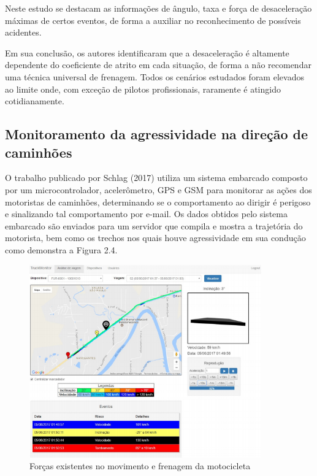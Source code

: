 \clearpage




Neste estudo se destacam as informações de ângulo, taxa e força de desaceleração máximas de certos eventos, de forma a auxiliar no reconhecimento de possíveis acidentes. 

Em sua conclusão, os autores identificaram que a desaceleração é altamente dependente do coeficiente de atrito em cada situação, de forma a não recomendar uma técnica universal de frenagem. Todos os cenários estudados foram elevados ao limite onde, com exceção de pilotos profissionais, raramente é atingido cotidianamente.


\subsection{Monitoramento da agressividade na direção de caminhões}

O trabalho publicado por Schlag (2017) utiliza um sistema embarcado composto por um microcontrolador, acelerômetro, GPS e GSM para monitorar as ações dos motoristas de caminhões, determinando se o comportamento ao dirigir é perigoso e sinalizando tal comportamento por e-mail. Os dados obtidos pelo sistema embarcado são enviados para um servidor que compila e mostra a trajetória do motorista, bem como os trechos nos quais houve agressividade em sua condução como demonstra a Figura 2.4.


\begin{figure}[H]

 \caption{Forças existentes no movimento e frenagem da motocicleta}
 \centering
  \includegraphics[width=100mm]{images/Cap2/analise.png}
  
\end{figure}

